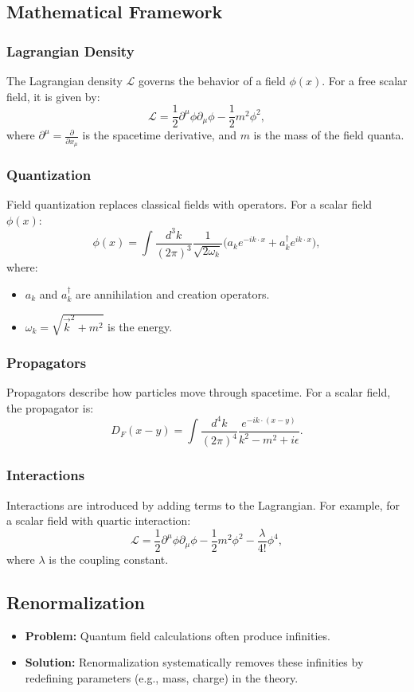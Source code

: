 \subsection{Mathematical Framework}
\subsubsection{Lagrangian Density}
The Lagrangian density \(\mathcal{L}\) governs the behavior of a field \(\phi(x)\). For a free scalar field, it is given by:
\[
\mathcal{L} = \frac{1}{2} \partial^\mu \phi \partial_\mu \phi - \frac{1}{2}m^2\phi^2,
\]
where \(\partial^\mu = \frac{\partial}{\partial x_\mu}\) is the spacetime derivative, and \(m\) is the mass of the field quanta.

\subsubsection{Quantization}
Field quantization replaces classical fields with operators. For a scalar field \(\phi(x)\):
\[
\phi(x) = \int \frac{d^3k}{(2\pi)^3} \frac{1}{\sqrt{2\omega_k}} \Big( a_k e^{-i k \cdot x} + a_k^\dagger e^{i k \cdot x} \Big),
\]
where:
\begin{itemize}
    \item \(a_k\) and \(a_k^\dagger\) are annihilation and creation operators.
    \item \(\omega_k = \sqrt{\vec{k}^2 + m^2}\) is the energy.
\end{itemize}

\subsubsection{Propagators}
Propagators describe how particles move through spacetime. For a scalar field, the propagator is:
\[
D_F(x - y) = \int \frac{d^4k}{(2\pi)^4} \frac{e^{-i k \cdot (x - y)}}{k^2 - m^2 + i\epsilon}.
\]

\subsubsection{Interactions}
Interactions are introduced by adding terms to the Lagrangian. For example, for a scalar field with quartic interaction:
\[
\mathcal{L} = \frac{1}{2} \partial^\mu \phi \partial_\mu \phi - \frac{1}{2}m^2\phi^2 - \frac{\lambda}{4!}\phi^4,
\]
where \(\lambda\) is the coupling constant.

\subsection{Renormalization}
\begin{itemize}
    \item \textbf{Problem:} Quantum field calculations often produce infinities.
    \item \textbf{Solution:} Renormalization systematically removes these infinities by redefining parameters (e.g., mass, charge) in the theory.
\end{itemize}

